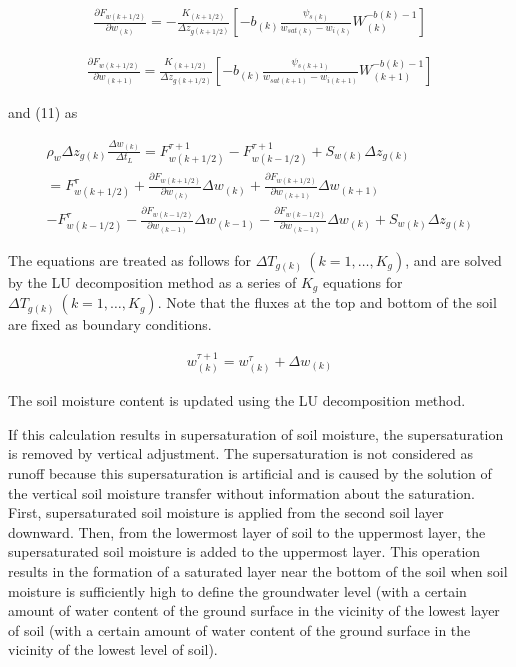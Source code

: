\begin{eqnarray}
 \frac{\partial {F}_{w(k+1/2)}}{\partial w_{(k)}} =
- \frac{K_{(k+1/2)}}{\Delta z_{g(k+1/2)}}
\left[
-b_{(k)} \frac{\psi_{s(k)}}{w_{sat(k)}-w_{i(k)}}W_{(k)}^{-b(k)-1}
\right]
\end{eqnarray}

\begin{eqnarray}
 \frac{\partial {F}_{w(k+1/2)}}{\partial w_{(k+1)}} =
 \frac{K_{(k+1/2)}}{\Delta z_{g(k+1/2)}}
\left[
-b_{(k)} \frac{\psi_{s(k+1)}}{w_{sat(k+1)}-w_{i(k+1)}}W_{(k+1)}^{-b(k)-1}
\right]
\end{eqnarray}

and (11) as

\begin{eqnarray}
\rho_w \Delta z_{g(k)} \frac{\Delta w_{(k)}}{\Delta t_L}
= F_{w(k+1/2)}^{\tau+1} - {F}_{w(k-1/2)}^{\tau+1} + S_{w(k)} \Delta z_{g(k)}  \\
= {F}_{w(k+1/2)}^{\tau}
+\frac{\partial F_{w(k+1/2)}}{\partial w_{(k)}}
 \Delta w_{(k)}
+\frac{\partial F_{w(k+1/2)}}{\partial w_{(k+1)}}
 \Delta w_{(k+1)}  \\
- F_{w(k-1/2)}^{\tau}
-\frac{\partial F_{w(k-1/2)}}{\partial w_{(k-1)}}
 \Delta w_{(k-1)}
-\frac{\partial F_{w(k-1/2)}}{\partial w_{(k-1)}}
 \Delta w_{(k)} + S_{w(k)} \Delta z_{g(k)}
\end{eqnarray}

The equations are treated as follows for
\(\Delta T_{g(k)}\ (k=1,\ldots,K_{g})\), and are solved by the LU
decomposition method as a series of \(K_{g}\) equations for
\(\Delta T_{g(k)}\ (k=1,\ldots,K_{g})\). Note that the fluxes at the top
and bottom of the soil are fixed as boundary conditions.

\begin{eqnarray}
 w_{(k)}^{\tau+1} = w_{(k)}^{\tau} + \Delta w_{(k)}
\end{eqnarray}

The soil moisture content is updated using the LU decomposition method.

If this calculation results in supersaturation of soil moisture, the
supersaturation is removed by vertical adjustment. The supersaturation
is not considered as runoff because this supersaturation is artificial
and is caused by the solution of the vertical soil moisture transfer
without information about the saturation. First, supersaturated soil
moisture is applied from the second soil layer downward. Then, from the
lowermost layer of soil to the uppermost layer, the supersaturated soil
moisture is added to the uppermost layer. This operation results in the
formation of a saturated layer near the bottom of the soil when soil
moisture is sufficiently high to define the groundwater level (with a
certain amount of water content of the ground surface in the vicinity of
the lowest layer of soil (with a certain amount of water content of the
ground surface in the vicinity of the lowest level of soil).

